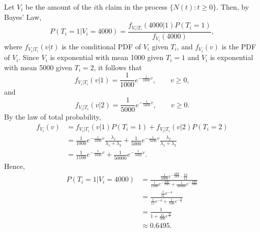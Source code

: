 \documentclass{homework}
\begin{document}
	Let $V_i$ be the amount of the $i$th claim in the process $\{N(t) : t \ge 0\}$. Then, by Bayes' Law,
	\begin{equation*}
		P(T_i = 1 |V_i=4000) = \frac{f_{V_i|T_i}(4000|1)P(T_i=1)}{f_{V_i}(4000)},
	\end{equation*}
	where $f_{V_i|T_i}(v|t)$ is the conditional PDF of $V_i$ given $T_i$, and $f_{V_i}(v)$ is the PDF of $V_i$. Since $V_i$ is exponential with mean 1000 given $T_i = 1$ and $V_i$ is exponential with mean 5000 given $T_i = 2$, it follows that
	\begin{equation*}
		f_{V_i|T_i}(v|1) = \frac{1}{1000}e^{-\frac{1}{1000}v}, \qquad v \ge 0,
	\end{equation*}
	and
	\begin{equation*}
		f_{V_i|T_i}(v|2) = \frac{1}{5000}e^{-\frac{1}{5000}v}, \qquad v \ge 0.
	\end{equation*}
	By the law of total probability,
	\begin{align*}
		f_{V_i}(v) &= f_{V_i|T_i}(v|1)P(T_i=1) + f_{V_i|T_i}(v|2)P(T_i=2) \\
		&= \frac{1}{1000}e^{-\frac{1}{1000}v}\frac{\lambda_1}{\lambda_1 + \lambda_2} + \frac{1}{5000}e^{-\frac{1}{5000}v}\frac{\lambda_2}{\lambda_1 + \lambda_2} \\
		&= \frac{1}{1100}e^{-\frac{1}{1000}v} + \frac{1}{50000}e^{-\frac{1}{5000}v}.
	\end{align*}
	Hence,
	\begin{align*}
		P(T_i=1|V_i=4000) &= \frac{\frac{1}{1000}e^{-\frac{4000}{1000}}\cdot\frac{10}{11}}{\frac{1}{1100}e^{-\frac{4000}{1000}} + \frac{1}{50000}e^{-\frac{4000}{5000}}} \\
		&= \frac{\frac{1}{11}e^{-4}}{\frac{1}{11}e^{-4} + \frac{1}{500}e^{-\frac{4}{5}}} \\
		&= \frac{1}{1 + \frac{11}{500}e^{\frac{16}{5}}} \\
		&\approx 0.6495.
	\end{align*}
	
\end{document}
